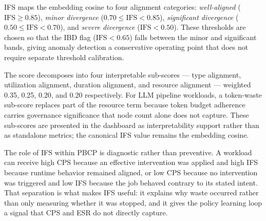 
IFS maps the embedding cosine to four alignment categories: \emph{well-aligned}
($\mathrm{IFS} \geq 0.85$), \emph{minor divergence} ($0.70 \leq \mathrm{IFS}
< 0.85$), \emph{significant divergence} ($0.50 \leq \mathrm{IFS} < 0.70$), and
\emph{severe divergence} ($\mathrm{IFS} < 0.50$). These thresholds are chosen
so that the IBD flag ($\mathrm{IFS} < 0.65$) falls between the minor and
significant bands, giving anomaly detection a conservative operating point that
does not require separate threshold calibration.

The score decomposes into four interpretable sub-scores — type alignment,
utilization alignment, duration alignment, and resource alignment — weighted
0.35, 0.25, 0.20, and 0.20 respectively. For LLM pipeline workloads, a
token-waste sub-score replaces part of the resource term because token budget
adherence carries governance significance that node count alone does not capture.
These sub-scores are presented in the dashboard as interpretability support
rather than as standalone metrics; the canonical IFS value remains the embedding
cosine.

The role of IFS within PBCP is diagnostic rather than preventive. A workload can
receive high CPS because an effective intervention was applied and high IFS
because runtime behavior remained aligned, or low CPS because no intervention
was triggered and low IFS because the job behaved contrary to its stated intent.
That separation is what makes IFS useful: it explains why waste occurred rather
than only measuring whether it was stopped, and it gives the policy learning loop
a signal that CPS and ESR do not directly capture.
